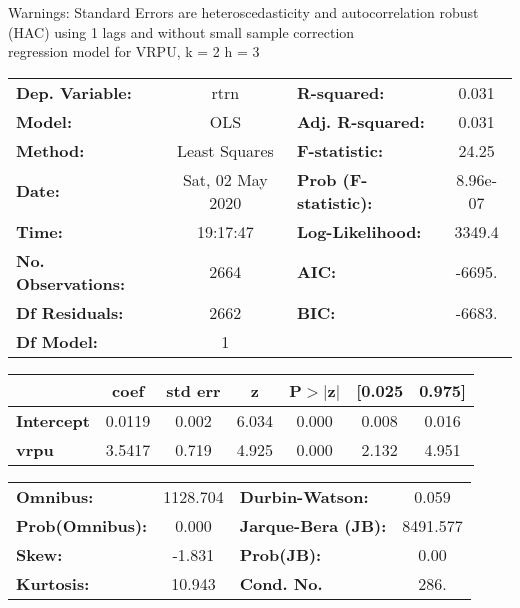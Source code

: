 Warnings: \newline
 [1] Standard Errors are heteroscedasticity and autocorrelation robust (HAC) using 1 lags and without small sample correction\\ 

regression model for VRPU, k = 2 h = 3\begin{center}
\begin{tabular}{lclc}
\toprule
\textbf{Dep. Variable:}    &       rtrn       & \textbf{  R-squared:         } &     0.031   \\
\textbf{Model:}            &       OLS        & \textbf{  Adj. R-squared:    } &     0.031   \\
\textbf{Method:}           &  Least Squares   & \textbf{  F-statistic:       } &     24.25   \\
\textbf{Date:}             & Sat, 02 May 2020 & \textbf{  Prob (F-statistic):} &  8.96e-07   \\
\textbf{Time:}             &     19:17:47     & \textbf{  Log-Likelihood:    } &    3349.4   \\
\textbf{No. Observations:} &        2664      & \textbf{  AIC:               } &    -6695.   \\
\textbf{Df Residuals:}     &        2662      & \textbf{  BIC:               } &    -6683.   \\
\textbf{Df Model:}         &           1      & \textbf{                     } &             \\
\bottomrule
\end{tabular}
\begin{tabular}{lcccccc}
                   & \textbf{coef} & \textbf{std err} & \textbf{z} & \textbf{P$> |$z$|$} & \textbf{[0.025} & \textbf{0.975]}  \\
\midrule
\textbf{Intercept} &       0.0119  &        0.002     &     6.034  &         0.000        &        0.008    &        0.016     \\
\textbf{vrpu}      &       3.5417  &        0.719     &     4.925  &         0.000        &        2.132    &        4.951     \\
\bottomrule
\end{tabular}
\begin{tabular}{lclc}
\textbf{Omnibus:}       & 1128.704 & \textbf{  Durbin-Watson:     } &    0.059  \\
\textbf{Prob(Omnibus):} &   0.000  & \textbf{  Jarque-Bera (JB):  } & 8491.577  \\
\textbf{Skew:}          &  -1.831  & \textbf{  Prob(JB):          } &     0.00  \\
\textbf{Kurtosis:}      &  10.943  & \textbf{  Cond. No.          } &     286.  \\
\bottomrule
\end{tabular}
\end{center}

